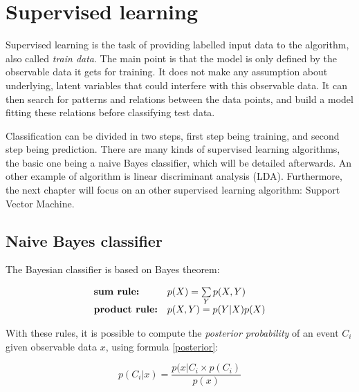 \section{Supervised learning}

\vspace{\baselineskip}
\noindent Supervised learning is the task of providing labelled input data to the algorithm, also called \textit{train data}. The main point is that the model is only defined by the observable data it gets for training. It does not make any assumption about underlying, latent variables that could interfere with this observable data. It can then search for patterns and relations between the data points, and build a model fitting these relations before classifying test data.
\newline

\noindent Classification can be divided in two steps, first step being training, and second step being prediction. There are many kinds of supervised learning algorithms, the basic one being a naive Bayes classifier, which will be detailed afterwards. An other example of algorithm is linear discriminant analysis (LDA). Furthermore, the next chapter will focus on an other supervised learning algorithm: Support Vector Machine.
\newline

\subsection{Naive Bayes classifier}

\vspace{\baselineskip}
\noindent The Bayesian classifier is based on Bayes theorem:
\newline

\begin{equation}
    \begin{array}{ll}
        \text{\textbf{sum rule: }} & p(X) = \sum\limits_{Y} p(X,Y) \\
        \text{\textbf{product rule:}} & p(X,Y) = p(Y|X)p(X)
    \end{array}
    \label{bayes}
\end{equation}

\vspace{\baselineskip}
\noindent With these rules, it is possible to compute the \textit{posterior probability} of an event $C_i$ given observable data $x$, using formula \ref{posterior}:

\begin{equation}
	p(C_i|x) = \frac{p(x|C_i \times p(C_i)}{p(x)}
	\label{posterior}
\end{equation}


